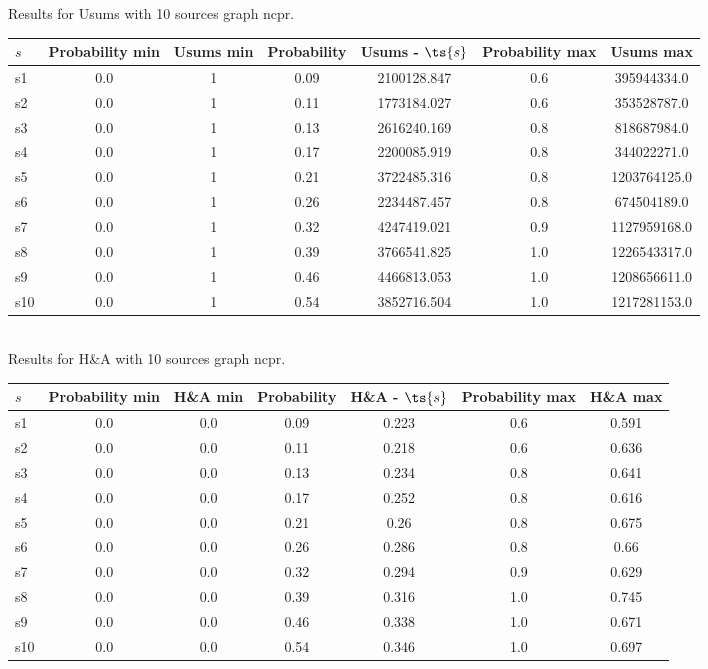 \documentclass{article}
\begin{document}
\noindent Results for Usums with 10 sources graph ncpr.

\noindent\begin{tabular}{|l|c|c|c|c|c|c|}
\hline
$s$& Probability min & Usums min & Probability & Usums - $\ts{s}$ & Probability max & Usums max\\
\hline
s1 &0.0 & 1 & 0.09 & 2100128.847 & 0.6 & 395944334.0\\
\hline
s2 &0.0 & 1 & 0.11 & 1773184.027 & 0.6 & 353528787.0\\
\hline
s3 &0.0 & 1 & 0.13 & 2616240.169 & 0.8 & 818687984.0\\
\hline
s4 &0.0 & 1 & 0.17 & 2200085.919 & 0.8 & 344022271.0\\
\hline
s5 &0.0 & 1 & 0.21 & 3722485.316 & 0.8 & 1203764125.0\\
\hline
s6 &0.0 & 1 & 0.26 & 2234487.457 & 0.8 & 674504189.0\\
\hline
s7 &0.0 & 1 & 0.32 & 4247419.021 & 0.9 & 1127959168.0\\
\hline
s8 &0.0 & 1 & 0.39 & 3766541.825 & 1.0 & 1226543317.0\\
\hline
s9 &0.0 & 1 & 0.46 & 4466813.053 & 1.0 & 1208656611.0\\
\hline
s10 &0.0 & 1 & 0.54 & 3852716.504 & 1.0 & 1217281153.0\\
\hline
\end{tabular}\\

\noindent Results for H\&A with 10 sources graph ncpr.

\noindent\begin{tabular}{|l|c|c|c|c|c|c|}
\hline
$s$& Probability min & H\&A min & Probability & H\&A - $\ts{s}$ & Probability max & H\&A max\\
\hline
s1 &0.0 & 0.0 & 0.09 & 0.223 & 0.6 & 0.591\\
\hline
s2 &0.0 & 0.0 & 0.11 & 0.218 & 0.6 & 0.636\\
\hline
s3 &0.0 & 0.0 & 0.13 & 0.234 & 0.8 & 0.641\\
\hline
s4 &0.0 & 0.0 & 0.17 & 0.252 & 0.8 & 0.616\\
\hline
s5 &0.0 & 0.0 & 0.21 & 0.26 & 0.8 & 0.675\\
\hline
s6 &0.0 & 0.0 & 0.26 & 0.286 & 0.8 & 0.66\\
\hline
s7 &0.0 & 0.0 & 0.32 & 0.294 & 0.9 & 0.629\\
\hline
s8 &0.0 & 0.0 & 0.39 & 0.316 & 1.0 & 0.745\\
\hline
s9 &0.0 & 0.0 & 0.46 & 0.338 & 1.0 & 0.671\\
\hline
s10 &0.0 & 0.0 & 0.54 & 0.346 & 1.0 & 0.697\\
\hline
\end{tabular}\\
\end{document}
